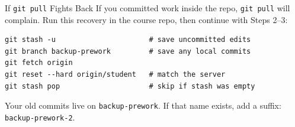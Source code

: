 \documentclass[aspectratio=169, 11pt]{beamer}
\begin{document}
\begin{frame}[fragile,label=gitpull]{If \texttt{git pull} Fights Back}
  If you committed work inside the repo, \texttt{git pull} will complain. Run this recovery in the course repo, then continue with Steps 2--3:

  \vspace{0.3em}
  \begin{lstlisting}[basicstyle=\ttfamily\footnotesize, keepspaces=true]
git stash -u                      # save uncommitted edits
git branch backup-prework         # save any local commits
git fetch origin
git reset --hard origin/student   # match the server
git stash pop                     # skip if stash was empty
  \end{lstlisting}

  \vspace{0.2em}
  {\small Your old commits live on \texttt{backup-prework}. If that name exists, add a suffix: \texttt{backup-prework-2}.}

  \vfill
  \hyperlink{ritual}{} \hfill \hyperlink{backmatter}{}
\end{frame}
\end{document}
